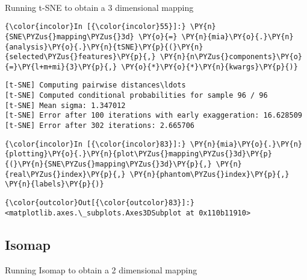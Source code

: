     \begin{center}
    \end{center}
    { \hspace*{\fill} \\}

    Running t-SNE to obtain a 3 dimensional mapping

    \begin{Verbatim}[commandchars=\\\{\}]
{\color{incolor}In [{\color{incolor}55}]:} \PY{n}{SNE\PYZus{}mapping\PYZus{}3d} \PY{o}{=} \PY{n}{mia}\PY{o}{.}\PY{n}{analysis}\PY{o}{.}\PY{n}{tSNE}\PY{p}{(}\PY{n}{selected\PYZus{}features}\PY{p}{,} \PY{n}{n\PYZus{}components}\PY{o}{=}\PY{l+m+mi}{3}\PY{p}{,} \PY{o}{*}\PY{o}{*}\PY{n}{kwargs}\PY{p}{)}
\end{Verbatim}

    \begin{Verbatim}[commandchars=\\\{\}]
[t-SNE] Computing pairwise distances\ldots
[t-SNE] Computed conditional probabilities for sample 96 / 96
[t-SNE] Mean sigma: 1.347012
[t-SNE] Error after 100 iterations with early exaggeration: 16.628509
[t-SNE] Error after 302 iterations: 2.665706
    \end{Verbatim}

    \begin{Verbatim}[commandchars=\\\{\}]
{\color{incolor}In [{\color{incolor}83}]:} \PY{n}{mia}\PY{o}{.}\PY{n}{plotting}\PY{o}{.}\PY{n}{plot\PYZus{}mapping\PYZus{}3d}\PY{p}{(}\PY{n}{SNE\PYZus{}mapping\PYZus{}3d}\PY{p}{,} \PY{n}{real\PYZus{}index}\PY{p}{,} \PY{n}{phantom\PYZus{}index}\PY{p}{,} \PY{n}{labels}\PY{p}{)}
\end{Verbatim}

            \begin{Verbatim}[commandchars=\\\{\}]
{\color{outcolor}Out[{\color{outcolor}83}]:} <matplotlib.axes.\_subplots.Axes3DSubplot at 0x110b11910>
\end{Verbatim}

    \subsection{Isomap}\label{isomap}

Running Isomap to obtain a 2 dimensional mapping

